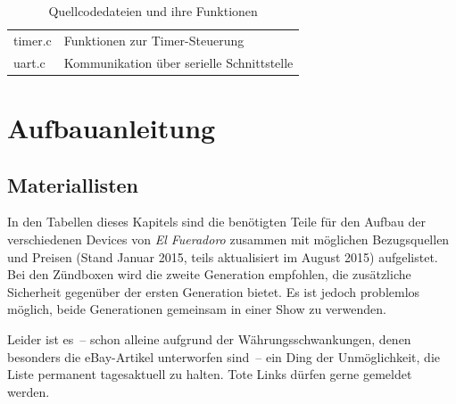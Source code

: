 \documentclass[paper=a4, parskip, numbers=noenddot, toc=listof, headsepline]{scrbook}
\newcommand{\anlage}{\emph{El Fueradoro}}
\begin{document}
\begin{table}[h]
\begin{tabular}{lp{125mm}}
				timer.c                         & Funktionen zur Timer-Steuerung                                                                                             \\
				uart.c                          & Kommunikation über serielle Schnittstelle                                                                                  \\ \hline\hline
			\end{tabular}
			\caption{Quellcodedateien und ihre Funktionen}
			\label{tab:sourcefiles}
		\end{table}

\part{Aufbauanleitung}
	\label{part:aufbauanleitung}

	\chapter{Materiallisten}

		In den Tabellen dieses Kapitels sind die benötigten Teile für den Aufbau der verschiedenen Devices von {\anlage} zusammen mit möglichen Bezugsquellen und Preisen (Stand Januar 2015, teils aktualisiert im August 2015) aufgelistet. Bei den Zündboxen wird die zweite Generation empfohlen, die zusätzliche Sicherheit gegenüber der ersten Generation bietet. Es ist jedoch problemlos möglich, beide Generationen gemeinsam in einer Show zu verwenden.

		Leider ist es~-- schon alleine aufgrund der Währungsschwankungen, denen besonders die eBay-Artikel unterworfen sind~-- ein Ding der Unmöglichkeit, die Liste permanent tagesaktuell zu halten. Tote Links dürfen gerne gemeldet werden.
\end{document}
